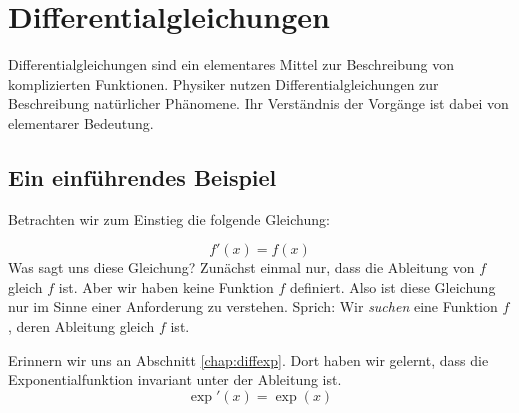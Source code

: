 
\chapter{Differentialgleichungen}\label{chap:diffgl}

Differentialgleichungen sind ein elementares Mittel zur Beschreibung von komplizierten Funktionen. Physiker nutzen Differentialgleichungen zur Beschreibung natürlicher Phänomene. Ihr Verständnis der Vorgänge ist dabei von elementarer Bedeutung.

\section{Ein einführendes Beispiel}

Betrachten wir zum Einstieg die folgende Gleichung:

\begin{equation}
f'(x) = f(x)
\end{equation}
Was sagt uns diese Gleichung? Zunächst einmal nur, dass die Ableitung von $f$ gleich $f$ ist. Aber wir haben keine Funktion $f$ definiert. Also ist diese Gleichung nur im Sinne einer Anforderung zu verstehen. Sprich: Wir \emph{suchen} eine Funktion $f$, deren Ableitung gleich $f$ ist. 

Erinnern wir uns an Abschnitt \ref{chap:diffexp}. Dort haben wir gelernt, dass die Exponentialfunktion invariant unter der Ableitung ist. 
\begin{equation}
\exp'(x) = \exp(x)
\end{equation}
